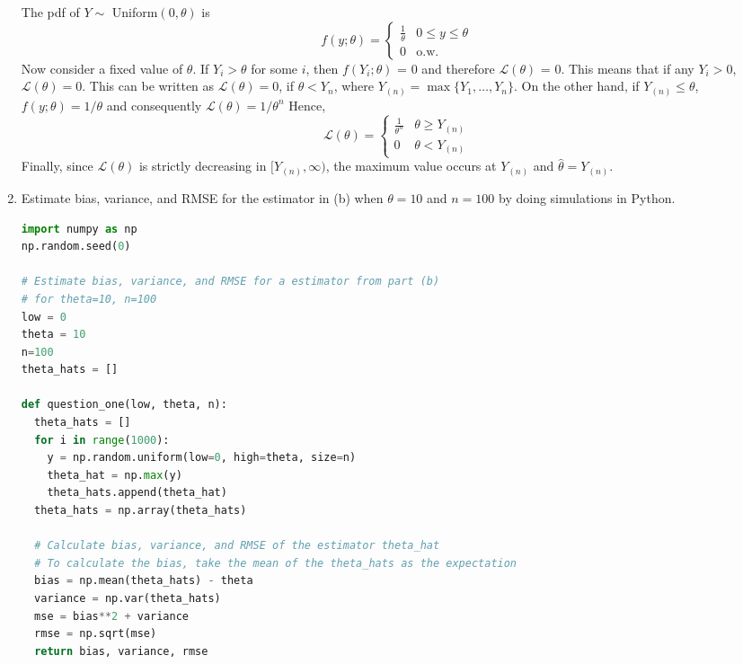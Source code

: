 \documentclass{article}
\begin{document}
\begin{enumerate}[label={(\alph*)}]
    The pdf of $Y \sim$ Uniform$(0,\theta)$ is
    \begin{equation}
        f(y;\theta) = 
        \begin{cases}
            \frac{1}{\theta} & 0 \leq y \leq \theta \\
            0 & \text{o.w.}
        \end{cases}
    \end{equation}
    Now consider a fixed value of $\theta$. If $Y_i > \theta$ for some $i$, then 
    $f(Y_i;\theta)$ = 0 and therefore $\mathcal{L}(\theta)$ = 0. This means that if any 
    $Y_i > 0$, $\mathcal{L}(\theta) = 0$. This can be written as $\mathcal{L}(\theta) = 0$, if $\theta < Y_n$, where $Y_{(n)} = \max\{Y_1,\ldots,Y_n\}$.
    On the other hand, if $Y_{(n)} \leq \theta$, $f(y;\theta) = 1/\theta$ and consequently $\mathcal{L}(\theta) = 1/\theta^n$
    Hence,
    \begin{equation}
            \mathcal{L}(\theta) =
        \begin{cases}
           \frac{1}{\theta^n} & \theta \geq Y_{(n)} \\
           0 & \theta < Y_{(n)}
        \end{cases}
    \end{equation}
    Finally, since $\mathcal{L}(\theta)$ is strictly decreasing in $[Y_{(n)}, \infty)$, the maximum value occurs at $Y_{(n)}$ and $\hat{\theta} = Y_{(n)}$.
    
    \item Estimate bias, variance, and RMSE for the estimator in (b) when $\theta = 10$ 
    and $n=100$ by doing simulations in Python.
    \begin{lstlisting}[language=Python, caption=Code for part (c)]
import numpy as np
np.random.seed(0)

# Estimate bias, variance, and RMSE for a estimator from part (b)
# for theta=10, n=100
low = 0
theta = 10
n=100
theta_hats = []

def question_one(low, theta, n):
  theta_hats = []
  for i in range(1000):
    y = np.random.uniform(low=0, high=theta, size=n)
    theta_hat = np.max(y)
    theta_hats.append(theta_hat)
  theta_hats = np.array(theta_hats)

  # Calculate bias, variance, and RMSE of the estimator theta_hat
  # To calculate the bias, take the mean of the theta_hats as the expectation
  bias = np.mean(theta_hats) - theta
  variance = np.var(theta_hats)
  mse = bias**2 + variance
  rmse = np.sqrt(mse)
  return bias, variance, rmse


\end{lstlisting}
\end{enumerate}
\end{document}
